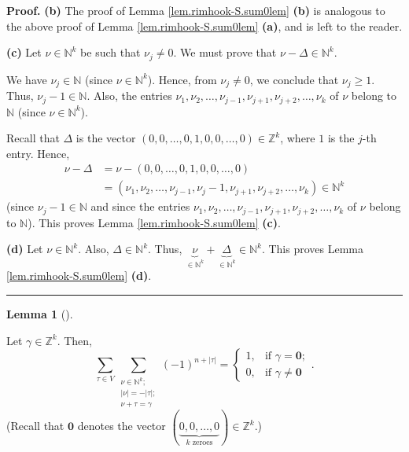 \documentclass[numbers=enddot,12pt,final,onecolumn,notitlepage]{scrartcl}%
\theoremstyle{definition}
\newtheorem{lem}[theo]{Lemma}
\newenvironment{lemma}[1][]
{\begin{lem}[#1]\begin{leftbar}}
{\end{leftbar}\end{lem}}
\newenvironment{proof}[1][Proof]{\noindent\textbf{#1.} }{\ \rule{0.5em}{0.5em}}
\let\sumnonlimits\sum
\renewcommand{\sum}{\sumnonlimits\limits}
\begin{document}
\begin{proof}
\textbf{(b)} The proof of Lemma \ref{lem.rimhook-S.sum0lem} \textbf{(b)} is
analogous to the above proof of Lemma \ref{lem.rimhook-S.sum0lem}
\textbf{(a)}, and is left to the reader.

\textbf{(c)} Let $\nu\in\mathbb{N}^{k}$ be such that $\nu_{j}\neq0$. We must
prove that $\nu-\Delta\in\mathbb{N}^{k}$.

We have $\nu_{j}\in\mathbb{N}$ (since $\nu\in\mathbb{N}^{k}$). Hence, from
$\nu_{j}\neq0$, we conclude that $\nu_{j}\geq1$. Thus, $\nu_{j}-1\in
\mathbb{N}$. Also, the entries $\nu_{1},\nu_{2},\ldots,\nu_{j-1},\nu_{j+1}%
,\nu_{j+2},\ldots,\nu_{k}$ of $\nu$ belong to $\mathbb{N}$ (since $\nu
\in\mathbb{N}^{k}$).

Recall that $\Delta$ is the vector $\left(  0,0,\ldots,0,1,0,0,\ldots
,0\right)  \in\mathbb{Z}^{k}$, where $1$ is the $j$-th entry. Hence,%
\begin{align*}
\nu-\Delta &  =\nu-\left(  0,0,\ldots,0,1,0,0,\ldots,0\right) \\
&  =\left(  \nu_{1},\nu_{2},\ldots,\nu_{j-1},\nu_{j}-1,\nu_{j+1},\nu
_{j+2},\ldots,\nu_{k}\right)  \in\mathbb{N}^{k}%
\end{align*}
(since $\nu_{j}-1\in\mathbb{N}$ and since the entries $\nu_{1},\nu_{2}%
,\ldots,\nu_{j-1},\nu_{j+1},\nu_{j+2},\ldots,\nu_{k}$ of $\nu$ belong to
$\mathbb{N}$). This proves Lemma \ref{lem.rimhook-S.sum0lem} \textbf{(c)}.

\textbf{(d)} Let $\nu\in\mathbb{N}^{k}$. Also, $\Delta\in\mathbb{N}^{k}$.
Thus, $\underbrace{\nu}_{\in\mathbb{N}^{k}}+\underbrace{\Delta}_{\in
\mathbb{N}^{k}}\in\mathbb{N}^{k}$. This proves Lemma
\ref{lem.rimhook-S.sum0lem} \textbf{(d)}.
\end{proof}

\begin{lemma}
\label{lem.rimhook-S.sum0}Let $\gamma\in\mathbb{Z}^{k}$. Then,%
\[
\sum_{\tau\in V}\sum_{\substack{\nu\in\mathbb{N}^{k};\\\left\vert
\nu\right\vert =-\left\vert \tau\right\vert ;\\\nu+\tau=\gamma}}\left(
-1\right)  ^{n+\left\vert \tau\right\vert }=%
\begin{cases}
1, & \text{if }\gamma=\mathbf{0};\\
0, & \text{if }\gamma\neq\mathbf{0}%
\end{cases}
.
\]
(Recall that $\mathbf{0}$ denotes the vector $\left(  \underbrace{0,0,\ldots
,0}_{k\text{ zeroes}}\right)  \in\mathbb{Z}^{k}$.)
\end{lemma}
\end{document}
